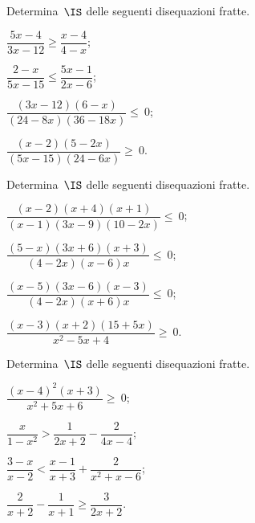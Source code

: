 \begin{esercizio}[\Ast]
\label{ese:21.59}
Determina~$\IS$ delle seguenti disequazioni fratte.
\begin{multicols}{2}
\begin{enumeratea}
\spazielenx
 \item $\dfrac{5x-4}{3x-12}\ge \dfrac{x-4}{4-x}$;
\item $\dfrac{2-x}{5x-15}\le \dfrac{5x-1}{2x-6}$;
\item $\dfrac{(3x-12)(6-x)}{(24-8x)(36-18x)}\leqslant~0$;
\item $\dfrac{(x-2)(5-2x)}{(5x-15)(24-6x)}\geqslant~0$.
\end{enumeratea}
\end{multicols}
\end{esercizio}
\begin{esercizio}[\Ast]
\label{ese:21.60}
Determina~$\IS$ delle seguenti disequazioni fratte.
\begin{multicols}{2}
\begin{enumeratea}
\spazielenx
\item $\dfrac{(x-2)(x+4)(x+1)}{(x-1)(3x-9)(10-2x)}\leqslant~0$;
\item $\dfrac{(5-x)(3x+6)(x+3)}{(4-2x)(x-6)x}\leqslant~0$;
\item $\dfrac{(x-5)(3x-6)(x-3)}{(4-2x)(x+6)x}\leqslant~0$;
\item $\dfrac{(x-3)(x+2)(15+5x)}{x^{2}-5x+4}\geqslant~0$.
\end{enumeratea}
\end{multicols}
\end{esercizio}

\begin{esercizio}[\Ast]
\label{ese:21.61}
Determina~$\IS$ delle seguenti disequazioni fratte.
\begin{multicols}{2}
\begin{enumeratea}
\spazielenx
\item $\dfrac{\left(x-4\right)^{2}(x+3)}{x^{2}+5x+6}\geqslant~0$;
\item $\dfrac{x}{1-x^{2}}>\dfrac{1}{2x+2}-\dfrac{2}{4x-4}$;
\item $\dfrac{3-x}{x-2}<\dfrac{x-1}{x+3}+\dfrac{2}{x^{2}+x-6}$;
\item $\dfrac{2}{x+2}-\dfrac{1}{x+1}\ge \dfrac{3}{2x+2}$.
\end{enumeratea}
\end{multicols}
\end{esercizio}

